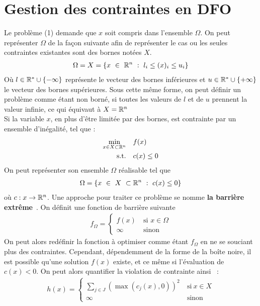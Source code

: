 \section{Gestion des contraintes en DFO}
Le problème (1) demande que $x$ soit compris dans l'ensemble $\Omega$. On peut représenter $\Omega$ de la façon suivante afin de représenter le cas ou les seules contraintes existantes sont des bornes notées $X$.
\begin{gather*}
\Omega = X = \{x\ \in\ \mathbb{R}^n\ :\ l_i \leq (x)_i \leq u_i\}\\
\end{gather*}
Où $l \in \mathbb{R}^*\cup\{-\infty\}$ représente le vecteur des bornes inférieures et $u \in \mathbb{R}^*\cup\{+\infty\}$ le vecteur des bornes supérieures. Sous cette même forme, on peut définir un problème comme étant non borné, si toutes les valeurs de $l$ et de $u$ prennent la valeur infinie, ce qui équivaut à $ X = \mathbb{R} ^n$ \\
Si la variable $x$, en plus d'être limitée par des bornes, est contrainte par un ensemble d'inégalité, tel que : 
\begin{equation*}
\begin{aligned}
\underset{x\in X \subset \mathbb{R} ^n}{\min}& & & f(x)\\
\text{s.t.}& & & c(x) \leq 0\\
\end{aligned}
\end{equation*}
On peut représenter son ensemble $\Omega$ réalisable tel que
\begin{gather*}
\Omega = \{x~\in~X~\subset \mathbb{R} ^n~:~ c(x) \leq 0\}
\end{gather*}
où $c:x\rightarrow \mathbb{R} ^n$. Une approche pour traiter ce problème se nomme \textbf{la barrière extrême}~\cite{AuDe2006}. On définit une fonction de barrière suivante
\begin{align*}
f_\Omega = \begin{cases}
f(x)~ &\text{si $x \in \Omega$}\\
\infty~ &\text{sinon}
\end{cases}
\end{align*}
On peut alors redéfinir la fonction à optimiser comme étant $f_\Omega$ en ne se souciant plus des contraintes. Cependant, dépendemment de la forme de la boîte noire, il est possible qu'une solution $f(x)$ existe, et ce même si l'évaluation de $c(x)<0$. On peut alors quantifier la violation de contrainte ainsi~\cite{AuHa2018} : 
\begin{align*}
h(x) = \begin{cases}
\sum_{j\in J}^{}(\max(c_j(x),0))^2~ &\text{si}~x\in X\\
\infty~ &\text{sinon}
\end{cases}
\end{align*}
